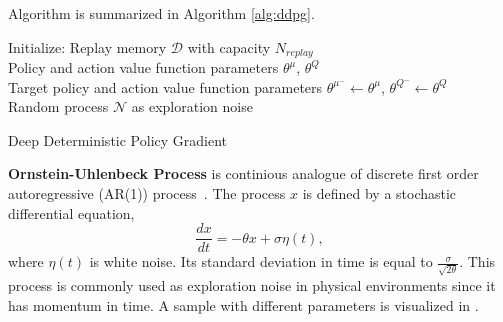 Algorithm is summarized in Algorithm \ref{alg:ddpg}. 
\begin{algorithm}
	\SetAlgoLined
	\DontPrintSemicolon %
	Initialize: Replay memory $\mathcal{D}$ with capacity $N_{replay}$ \\
	Policy and action value function parameters $\theta^{\mu}$, $\theta^Q$ \\
	Target policy and action value function parameters $\theta^{\mu^-} \leftarrow \theta^{\mu}$, $\theta^{Q^-} \leftarrow \theta^{Q}$ \\
	Random process $\mathcal{N}$ as exploration noise\\
	\caption{Deep Deterministic Policy Gradient}
	\label{alg:ddpg}
\end{algorithm}

\textbf{Ornstein-Uhlenbeck Process} is continious analogue of discrete first order autoregressive (AR(1)) process~\cite{uhlenbeck_theory_1930}. 
The process $x$ is defined by a stochastic differential equation,
\begin{equation}
\label{eqn:ou_process}
\frac{dx}{dt} = -\theta x + \sigma \eta(t),
\end{equation}
where $\eta(t)$ is white noise. 
Its standard deviation in time is equal to $\frac{\sigma}{\sqrt{2\theta}}$. 
This process is commonly used as exploration noise in physical environments since it has momentum in time. 
A sample with different parameters is visualized in .

